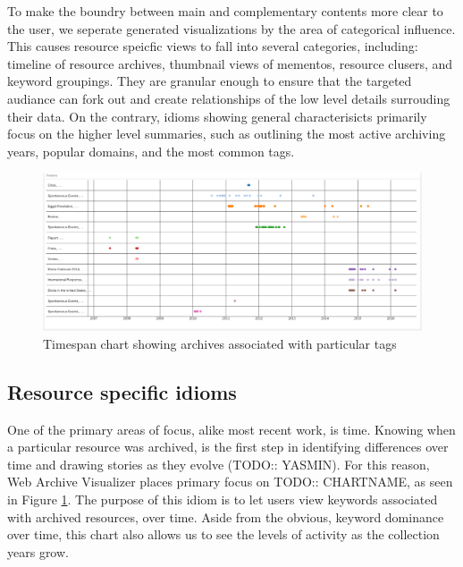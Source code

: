 \documentclass[10pt,journal,compsoc]{IEEEtran}
\begin{document}
To make the boundry between main and complementary contents more clear to the user, we seperate generated visualizations by the area of categorical influence. This causes resource speicfic views to fall into several categories, including: timeline of resource archives, thumbnail views of mementos, resource clusers, and keyword groupings. They are granular enough to ensure that the targeted audiance can fork out and create relationships of the low level details surrouding their data. On the contrary, idioms showing general characterisicts primarily focus on the higher level summaries, such as outlining the most active archiving years, popular domains, and the most common tags. \par 

\begin{figure}
\centering
\includegraphics[width=\textwidth]{Figure4}
\caption{Timespan chart showing archives associated with particular tags}
\label{fig:mesh3}
\end{figure}

\subsection{Resource specific idioms}
One of the primary areas of focus, alike most recent work, is time. Knowing when a particular resource was archived, is the first step in identifying differences over time and drawing stories as they evolve (TODO:: YASMIN). For this reason, Web Archive Visualizer places primary focus on TODO:: CHARTNAME, as seen in Figure \ref{fig:mesh3}. The purpose of this idiom is to let users view keywords associated with archived resources, over time. Aside from the obvious, keyword dominance over time, this chart also allows us to see the levels of activity as the collection years grow.
\end{document}

